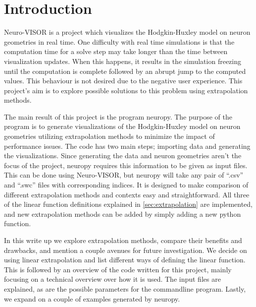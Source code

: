 
\section{Introduction}%
\label{sec:introduction}

Neuro-VISOR is a project which visualizes the Hodgkin-Huxley model on neuron geometries in real time\cite{neuroVISOR}.
One difficulty with real time simulations is that the computation time for a solve step may take longer than the time between visualization updates.
When this happens, it results in the simulation freezing until the computation is complete followed by an abrupt jump to the computed values.
This behaviour is not desired due to the negative user experience.
This project's aim is to explore possible solutions to this problem using extrapolation methods.

The main result of this project is the program neuropy\cite{neuropy}.
The purpose of the program is to generate visualizations of the Hodgkin-Huxley model on neuron geometries utilizing extrapolation methods to minimize the impact of performance issues.
The code has two main steps; importing data and generating the visualizations.
Since generating the data and neuron geometries aren't the focus of the project, neuropy requires this information to be given as input files.
This can be done using Neuro-VISOR, but neuropy will take any pair of ``.csv'' and ``.swc'' files with corresponding indices.
It is designed to make comparison of different extrapolation methods and contexts easy and straightforward. 
All three of the linear function definitions explained in \cref{sec:extrapolation} are implemented, and new extrapolation methods can be added by simply adding a new python function.

In this write up we explore extrapolation methods, compare their benefits and drawbacks, and mention a couple avenues for future investigation.
We decide on using linear extrapolation and list different ways of defining the linear function.
This is followed by an overview of the code written for this project, mainly focusing on a technical overview over how it is used.
The input files are explained, as are the possible parameters for the commandline program.
Lastly, we expand on a couple of examples generated by neuropy.
